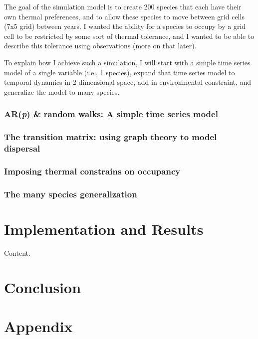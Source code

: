\documentclass{article}\usepackage[]{graphicx}\usepackage[]{color}
\begin{document}
\par
The goal of the simulation model is to create 200 species that each have their own thermal preferences, and to allow these species to move between grid cells (7x5 grid) between years. I wanted the ability for a species to occupy by a grid cell to be restricted by some sort of thermal tolerance, and I wanted to be able to describe this tolerance using observations (more on that later).

\par
To explain how I achieve such a simulation, I will start with a simple time series model of a single variable (i.e., 1 species), expand that time series model to temporal dynamics in 2-dimensional space, add in environmental constraint, and generalize the model to many species.

\subsubsection{AR(\emph{p}) \& random walks: A simple time series model}

\subsubsection{The transition matrix: using graph theory to model dispersal}

\subsubsection{Imposing thermal constrains on occupancy}

\subsubsection{The many species generalization}

\section{Implementation and Results}
\label{sec:IandR}
Content.

\section{Conclusion}

\section{Appendix}
\end{document}
